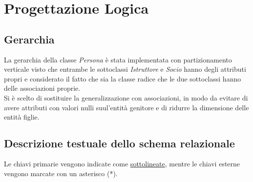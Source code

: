 \chapter{Progettazione Logica} 

\section{Gerarchia}
La gerarchia della classe \textit{Persona} è stata implementata con partizionamento verticale visto che entrambe le sottoclassi \textit{Istruttore} e \textit{Socio} hanno degli attributi propri e considerato il fatto che sia la classe radice che le due sottoclassi hanno delle associazioni proprie.\\
Si è scelto di sostituire la generalizzazione con associazioni, in modo da evitare di avere attributi con valori nulli suul'entità genitore e di ridurre la dimensione delle entità figlie. 

\section{Descrizione testuale dello schema relazionale}
Le chiavi primarie vengono indicate come \underline{sottolineate}, mentre le chiavi esterne vengono marcate con un asterisco (*).\\

